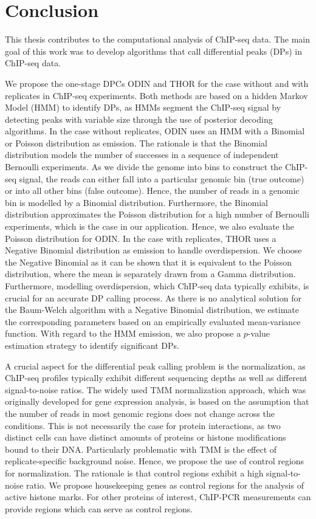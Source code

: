 \chapter{Conclusion}
\label{chapter_conclusion}
This thesis contributes to the computational analysis of ChIP-seq data.
The main goal of this work was to develop algorithms that call differential peaks (DPs) in ChIP-seq data.

We propose the one-stage DPCs ODIN and THOR for the case without and with replicates in ChIP-seq experiments.
Both methods are based on a hidden Markov Model (HMM) to identify DPs, as HMMs segment the ChIP-seq signal by detecting peaks with variable size through the use of posterior decoding algorithms.
In the case without replicates, ODIN uses an HMM with a Binomial or Poisson distribution as emission.
The rationale is that the Binomial distribution models the number of successes in a sequence of independent Bernoulli experiments.
As we divide the genome into bins to construct the ChIP-seq signal, the reads can either fall into a particular genomic bin (true outcome) or into all other bins (false outcome).
Hence, the number of reads in a genomic bin is modelled by a Binomial distribution.
Furthermore, the Binomial distribution approximates the Poisson distribution for a high number of Bernoulli experiments, which is the case in our application.
Hence, we also evaluate the Poisson distribution for ODIN.
In the case with replicates, THOR uses a Negative Binomial distribution as emission to handle overdispersion.
We choose the Negative Binomial as it can be shown that it is equivalent to the Poisson distribution, where the mean is separately drawn from a Gamma distribution.
Furthermore, modelling overdispersion, which ChIP-seq data typically exhibits, is crucial for an accurate DP calling process.
As there is no analytical solution for the Baum-Welch algorithm with a Negative Binomial distribution, we estimate the corresponding parameters based on an empirically evaluated mean-variance function.
With regard to the HMM emission, we also propose a $p$-value estimation strategy to identify significant DPs.

A crucial aspect for the differential peak calling problem is the normalization, as ChIP-seq profiles typically exhibit different sequencing depths as well as different signal-to-noise ratios.
The widely used TMM normalization approach, which was originally developed for gene expression analysis, is based on the assumption that the number of reads in most genomic regions does not change across the conditions. 
This is not necessarily the case for protein interactions, as two distinct cells can have distinct amounts of proteins or histone modifications bound to their DNA. 
Particularly problematic with TMM is the effect of replicate-specific background noise. 
Hence, we propose the use of control regions for normalization.
The rationale is that control regions exhibit a high signal-to-noise ratio.
We propose housekeeping genes as control regions for the analysis of active histone marks.
For other proteins of interest, ChIP-PCR measurements can provide regions which can serve as control regions.

